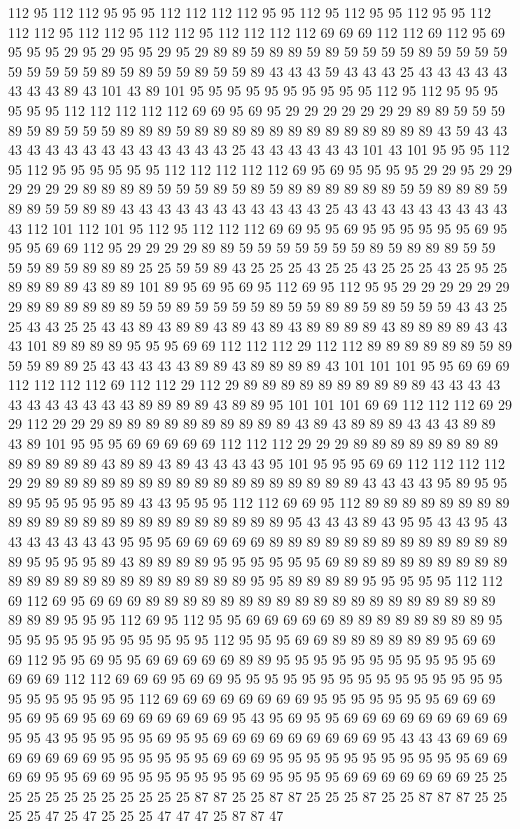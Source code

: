 112 95 112 112 95 95 95 112 112 112 112 95 95 112 95 112 95 95 112 95 95 112 112 112 95 112 112 95 112 112 95 112 112 112 112 69 69 69 112 112 69 112 95 69 95 95 95 29 95 29 95 95 29 95 29 89 89 59 89 89 59 89 59 59 59 59 89 59 59 59 59 59 59 59 59 59 89 59 89 59 59 89 59 59 89 43 43 43 59 43 43 43 25 43 43 43 43 43 43 43 43 89 43 101 43 89 101 95 95 95 95 95 95 95 95 95 95 112 95 112 95 95 95 95 95 95 112 112 112 112 112 69 69 95 69 95 29 29 29 29 29 29 29 89 89 59 59 59 89 59 89 59 59 59 89 89 89 59 89 89 89 89 89 89 89 89 89 89 89 89 89 43 59 43 43 43 43 43 43 43 43 43 43 43 43 43 43 25 43 43 43 43 43 43 101 43 101 95 95 95 112 95 112 95 95 95 95 95 95 112 112 112 112 112 69 95 69 95 95 95 95 29 29 95 29 29 29 29 29 29 89 89 89 89 59 59 59 89 59 89 59 89 89 89 89 89 89 59 59 89 89 89 59 89 89 59 59 89 89 43 43 43 43 43 43 43 43 43 43 43 25 43 43 43 43 43 43 43 43 43 43 112 101 112 101 95 112 95 112 112 112 69 69 95 95 69 95 95 95 95 95 95 69 95 95 95 69 69 112 95 29 29 29 29 89 89 59 59 59 59 59 59 59 89 59 89 89 89 59 59 59 59 89 59 89 89 89 25 25 59 59 89 43 25 25 25 43 25 25 43 25 25 25 43 25 95 25 89 89 89 89 43 89 89 101 89 95 69 95 69 95 112 69 95 112 95 95 29 29 29 29 29 29 29 89 89 89 89 89 89 59 59 89 59 59 59 59 89 59 59 89 89 59 89 59 59 59 43 43 25 25 43 43 25 25 43 43 89 43 89 89 43 89 43 89 43 89 89 89 89 43 89 89 89 89 43 43 43 101 89 89 89 89 95 95 95 69 69 112 112 112 29 112 112 89 89 89 89 89 89 59 89 59 59 89 89 25 43 43 43 43 43 89 89 43 89 89 89 89 43 101 101 101 95 95 69 69 69 112 112 112 112 69 112 112 29 112 29 89 89 89 89 89 89 89 89 89 89 43 43 43 43 43 43 43 43 43 43 43 89 89 89 89 43 89 89 95 101 101 101 69 69 112 112 112 69 29 29 112 29 29 29 89 89 89 89 89 89 89 89 89 89 43 89 43 89 89 89 43 43 43 89 89 43 89 101 95 95 95 69 69 69 69 69 112 112 112 29 29 29 89 89 89 89 89 89 89 89 89 89 89 89 89 43 89 89 43 89 43 43 43 43 95 101 95 95 95 69 69 112 112 112 112 29 29 89 89 89 89 89 89 89 89 89 89 89 89 89 89 89 89 89 43 43 43 43 95 89 95 95 89 95 95 95 95 95 89 43 43 95 95 95 112 112 69 69 95 112 89 89 89 89 89 89 89 89 89 89 89 89 89 89 89 89 89 89 89 89 89 89 89 95 43 43 43 89 43 95 95 43 43 95 43 43 43 43 43 43 43 95 95 95 69 69 69 69 69 89 89 89 89 89 89 89 89 89 89 89 89 89 89 95 95 95 95 89 43 89 89 89 89 95 95 95 95 95 95 69 89 89 89 89 89 89 89 89 89 89 89 89 89 89 89 89 89 89 89 89 89 89 95 95 89 89 89 89 95 95 95 95 95 112 112 69 112 69 95 69 69 69 89 89 89 89 89 89 89 89 89 89 89 89 89 89 89 89 89 89 89 89 89 89 95 95 95 112 69 95 112 95 95 69 69 69 69 69 89 89 89 89 89 89 89 89 95 95 95 95 95 95 95 95 95 95 95 95 112 95 95 95 69 69 89 89 89 89 89 89 95 69 69 69 112 95 95 69 95 95 69 69 69 69 69 89 89 95 95 95 95 95 95 95 95 95 95 95 69 69 69 69 112 112 69 69 69 95 69 69 95 95 95 95 95 95 95 95 95 95 95 95 95 95 95 95 95 95 95 95 95 95 112 69 69 69 69 69 69 69 69 95 95 95 95 95 95 95 69 69 69 95 69 95 69 95 69 69 69 69 69 69 69 95 43 95 69 95 95 69 69 69 69 69 69 69 69 69 95 95 43 95 95 95 95 95 69 95 95 69 69 69 69 69 69 69 69 69 95 43 43 43 69 69 69 69 69 69 69 69 95 95 95 95 95 95 69 69 69 95 95 95 95 95 95 95 95 95 95 95 69 69 69 69 95 95 69 69 95 95 95 95 95 95 95 69 95 95 95 95 69 69 69 69 69 69 69 25 25 25 25 25 25 25 25 25 25 25 25 87 87 25 25 87 87 25 25 25 87 25 25 87 87 87 25 25 25 25 47 25 47 25 25 25 47 47 47 25 87 87 47 